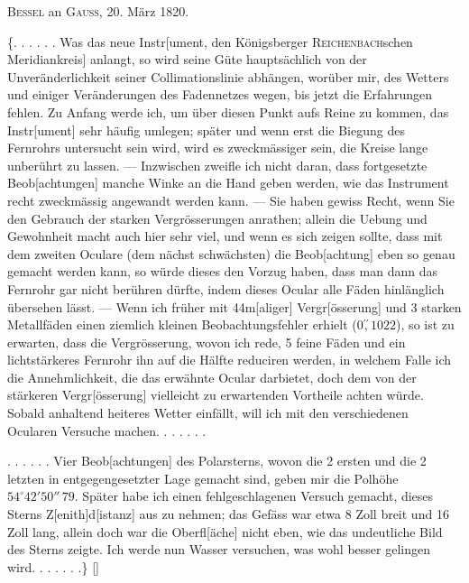 \begin{center}\textsc{Bessel} an \textsc{Gauss}, 20. März 1820.\end{center}
\noindent\hspace*{\parindent}\{. . . . . . Was das neue Instr[ument, den Königsberger \textsc{Reichenbach}schen Meridiankreis] anlangt, so wird seine Güte hauptsächlich von der Unveränderlichkeit seiner Collimationslinie abhängen, worüber mir, des Wetters und einiger Veränderungen des Fadennetzes wegen, bis jetzt die Erfahrungen fehlen. Zu Anfang werde ich, um über diesen Punkt aufs Reine zu kommen, das Instr[ument] sehr häufig umlegen; später und wenn erst die Biegung des Fernrohrs untersucht sein wird, wird es zweckmässiger sein, die Kreise lange unberührt zu lassen. — Inzwischen zweifle ich nicht daran, dass fortgesetzte Beob[achtungen] manche Winke an die Hand geben werden, wie das Instrument recht zweckmässig angewandt werden kann. — Sie haben gewiss Recht, wenn Sie den Gebrauch der starken Vergrösserungen anrathen; allein die Uebung und Gewohnheit macht auch hier sehr viel, und wenn es sich zeigen sollte, dass mit dem zweiten Oculare (dem nächst schwächsten) die Beob[achtung] eben so genau gemacht werden kann, so würde dieses den Vorzug haben, dass man dann das Fernrohr gar nicht berühren dürfte, indem dieses Ocular alle Fäden hinlänglich übersehen lässt. — Wenn ich früher mit 44m[aliger] Vergr[össerung] und 3 starken Metallfäden einen ziemlich kleinen Beobachtungsfehler erhielt (\(0\overset{\prime\prime}{,}1022\)), so ist zu erwarten, dass die Vergrösserung, wovon ich rede, 5 feine Fäden und ein lichtstärkeres Fernrohr ihn auf die Hälfte reduciren werden, in welchem Falle ich die Annehmlichkeit, die das erwähnte Ocular darbietet, doch dem von der stärkeren Vergr[össerung] vielleicht zu erwartenden Vortheile  achten würde. Sobald anhaltend heiteres Wetter einfällt, will ich mit den verschiedenen Ocularen Versuche machen. . . . . . .

. . . . . . Vier Beob[achtungen] des Polarsterns, wovon die 2 ersten und die 2 letzten in entgegengesetzter Lage gemacht sind, geben mir die Polhöhe \(54^\circ42'50''\,79\). Später habe ich einen fehlgeschlagenen Versuch gemacht, dieses Sterns Z[enith]d[istanz] aus  zu nehmen; das Gefäss war etwa 8 Zoll breit und 16 Zoll lang, allein doch war die Oberfl[äche] nicht eben,
\clearpage{}
\noindent wie das undeutliche Bild des Sterns zeigte. Ich werde nun Wasser versuchen, was wohl besser gelingen wird. . . . . . .\} [\begingroup\renewcommand{\thefootnote}{*)}\footnotemark\renewcommand{\thefootnote}{[*)}\footnotetext{Vermuthlich war die Krümmung des Quecksilberhorizonts infolge der Kapillarität der Grund, warum weder \textsc{Gauss} noch \textsc{Bessel} diesen sogleich regelmässig benutzten. Vgl. die auf Seite 342 abgedruckte Briefstelle.]}\endgroup]

